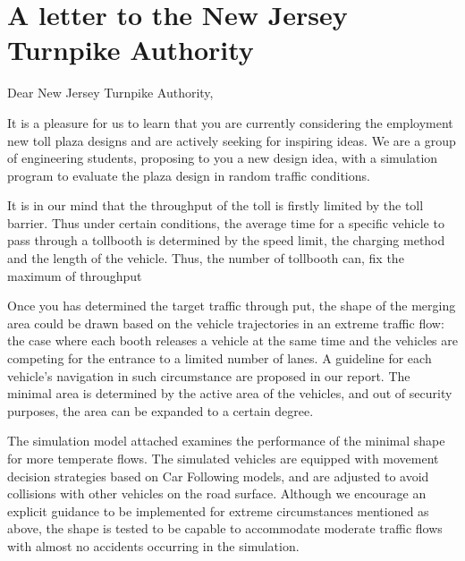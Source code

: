 \documentclass{mcmthesis}
\begin{document}
\maketitle
\tableofcontents
\clearpage








\section*{A letter to the New Jersey Turnpike Authority}
\vspace{5ex}
Dear New Jersey Turnpike Authority,	\vspace{3ex}
  		  
It is a pleasure for us to learn that you are currently considering the employment new toll plaza designs and are actively seeking for inspiring ideas. We are a group of engineering students, proposing to you a new design idea, with a simulation program to evaluate the plaza design in random traffic conditions. 		 
  		  
It is in our mind that the throughput of the toll is firstly limited by the toll barrier. Thus under certain conditions, the average time for a specific vehicle to pass through a tollbooth is determined by the speed limit, the charging method and the length of the vehicle. Thus, the number of tollbooth can, fix the maximum of throughput 		
  		  
Once you has determined the target traffic through put, the shape of the merging area could be drawn based on the vehicle trajectories in an extreme traffic flow: the case where each booth releases a vehicle at the same time and the vehicles are competing for the entrance to a limited number of lanes. A guideline for each vehicle's navigation in such circumstance are proposed in our report. The minimal area is determined by the active area of the vehicles, and out of security purposes, the area can be expanded to a certain degree.	
  		  
The simulation model attached examines the performance of the minimal shape for more temperate flows. The simulated vehicles are equipped with movement decision strategies based on Car Following models, and are adjusted to avoid collisions with other vehicles on the road surface. Although we encourage an explicit guidance to be implemented for extreme circumstances mentioned as above, the shape is tested to be capable to accommodate moderate traffic flows with almost no accidents occurring in the simulation.	
  		  
\end{document}
